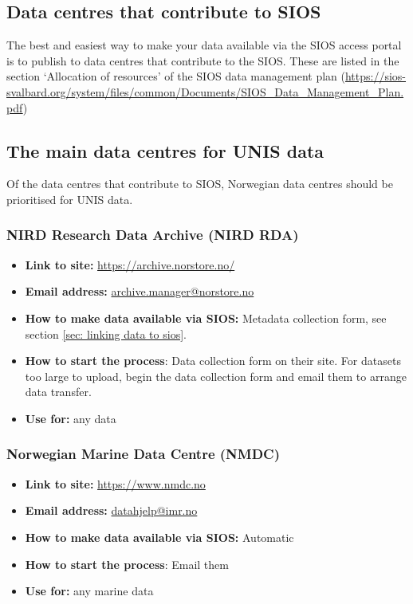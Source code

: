 \documentclass[a4paper,12pt]{article}
\begin{document}
\subsection{Data centres that contribute to SIOS}

The best and easiest way to make your data available via the SIOS access portal is to publish to data centres that contribute to the SIOS. These are listed in the section ‘Allocation of resources’ of the SIOS data management plan (\url{https://sios-svalbard.org/system/files/common/Documents/SIOS_Data_Management_Plan.pdf})

\subsection{The main data centres for UNIS data}

Of the data centres that contribute to SIOS, Norwegian data centres should be prioritised for UNIS data.

\subsubsection{NIRD Research Data Archive (NIRD RDA)}
\begin{itemize}
    \item \textbf{Link to site:} \url{https://archive.norstore.no/}
    \item \textbf{Email address:} \href{mailto:archive.manager@norstore.no}{archive.manager@norstore.no}
    \item \textbf{How to make data available via SIOS:} Metadata collection form, see section \ref{sec: linking data to sios}.
    \item \textbf{How to start the process}: Data collection form on their site. For datasets too large to upload, begin the data collection form and email them to arrange data transfer.
    \item \textbf{Use for: } any data
\end{itemize}

\subsubsection{Norwegian Marine Data Centre (NMDC)}
\begin{itemize}
    \item \textbf{Link to site:} \url{https://www.nmdc.no}
    \item \textbf{Email address:} \href{mailto:datahjelp@imr.no}{datahjelp@imr.no}
    \item \textbf{How to make data available via SIOS:} Automatic
    \item \textbf{How to start the process}: Email them
    \item \textbf{Use for: } any marine data
\end{itemize}
\end{document}
